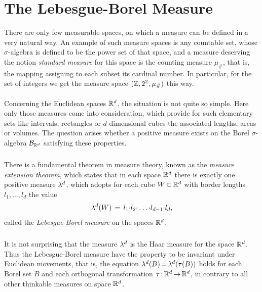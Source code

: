 \documentclass[11pt,twoside]{article}
\begin{document}
\section{The Lebesgue-Borel Measure}
There are only few measurable spaces,
on which a measure can be defined in a very natural way.
An example of such measure spaces is any countable set,
whose $\sigma$-algebra is defined to be the power set of that space,
and a measure deserving the notion \textit{standard measure} for this space
is the counting measure $\mu_{\#}$,
that is,
the mapping assigning to each subset its cardinal number.
In particular,
for the set of integers
we get the measure space $({\mathbb{Z}},2^{{\mathbb{Z}}},\mu_{\#})$ this way.

\paragraph{}
Concerning the Euclidean spaces ${\mathbb{R}}^d$,
the situation is not quite so simple.
Here only those measures come into consideration,
which provide for such elementary sets like intervals,
rectangles or $d$-dimensional cubes
the associated lengths, areas or volumes.
The question arises
whether a positive measure exists on the Borel $\sigma$-algebra
${\mathcal{B}}_{{{\mathbb{R}}}^d}$ satisfying these properties.

\subparagraph{}
There is a fundamental theorem in measure theory,
known as the \textit{measure extension theorem},
which states
that in each space ${\mathbb{R}}^d$
there is exactly one positive measure $\lambda^d$,
which adopts for each cube $W {\,\subset\,} {\mathbb{R}}^d$ with border lengths $l_1,\ldots,l_d$
the value
\[
\lambda^d(W) \,=\, l_1 {\cdot} l_2 {\cdot} \ldots {\cdot} l_{d-1} {\cdot} l_d,
\]
called the \textit{Lebesgue-Borel measure} on the spaces ${\mathbb{R}}^d$.

\subparagraph{}
It is not surprising 
that the measure $\lambda^d$ is the Haar measure for the space ${\mathbb{R}}^d$.
Thus the Lebesgue-Borel measure have the property
to be invariant under Euclidean movements,
that is,
the equation $\lambda^d(B) {\,=\,} \lambda^d(\tau(B))$ holds
for each Borel set $B$ and
each orthogonal transformation $\tau {\,:\,} {\mathbb{R}}^d {\,\to\,} {\mathbb{R}}^d$,
in contrary to all other thinkable measures on space ${\mathbb{R}}^d$.
\end{document}
